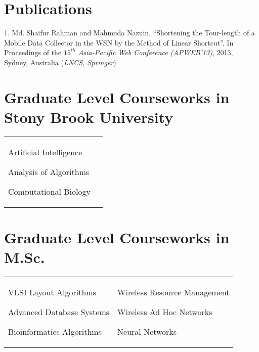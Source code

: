 \documentclass[margin,line,pifont,palatino,courier]{res}
\newenvironment{list1}{
  \begin{list}{\ding{113}}{%
      \setlength{\itemsep}{0in}
      \setlength{\parsep}{0in} \setlength{\parskip}{0in}
      \setlength{\topsep}{0in} \setlength{\partopsep}{0in}
      \setlength{\leftmargin}{0.17in}}}{\end{list}}
\begin{document}
\begin{resume}
\section{\sc Publications}
1. Md. Shaifur Rahman and Mahmuda Naznin, ``Shortening the Tour-length of a Mobile Data Collector
  in the WSN by the Method of Linear Shortcut''. In Proceedings of the
  \textit{$15^{th}$ Asia-Pacific Web Conference (APWEB'13)}, 2013, Sydney,
  Australia (\textit{LNCS, Springer})
\section{\sc Graduate Level Courseworks in Stony Brook University}
\begin{tabular}{@{}p{2.3in}p{3in}}
\begin{list1}
\item Artificial Intelligence
\item Analysis of Algorithms 
\item Computational Biology
\end{list1}
\end{tabular}

\section{\sc Graduate Level Courseworks in M.Sc.}
\begin{tabular}{@{}p{2.3in}p{3in}}
\begin{list1}
\item VLSI Layout Algorithms
\item Advanced Database Systems 
\item Bioinformatics Algorithms 
\end{list1}
&
\begin{list1}
\item Wireless Resource Management 
\item Wireless Ad Hoc Networks 
\item Neural Networks 
\end{list1}
\end{tabular}



\end{resume}
\end{document}
